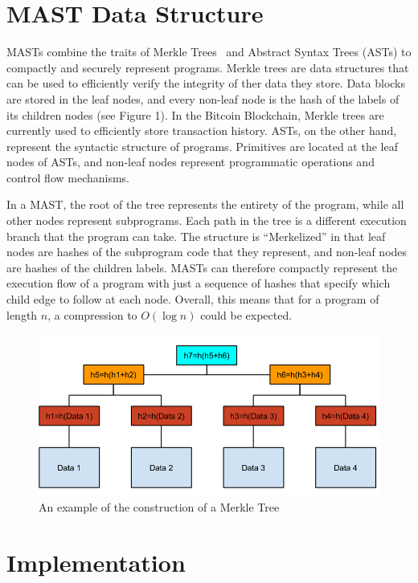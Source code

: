 \documentclass{vldb}
\begin{document}
\section{MAST Data Structure}

MASTs combine the traits of Merkle Trees~\cite{merkle} and Abstract Syntax
Trees (ASTs) to compactly and securely represent programs. Merkle trees are
data structures that can be used to efficiently verify the integrity of ther
data they store.  Data blocks are stored in the leaf nodes, and every non-leaf
node is the hash of the labels of its children nodes (see Figure 1). In the
Bitcoin Blockchain, Merkle trees are currently used to efficiently store
transaction history. ASTs, on the other hand, represent the syntactic structure
of programs. Primitives are located at the leaf nodes of ASTs, and non-leaf
nodes represent programmatic operations and control flow mechanisms.
 
In a MAST, the root of the tree represents the entirety of the program, while
all other nodes represent subprograms. Each path in the tree is a different
execution branch that the program can take. The structure is “Merkelized” in
that leaf nodes are hashes of the subprogram code that they represent, and
non-leaf nodes are hashes of the children labels. MASTs can therefore compactly
represent the execution flow of a program with just a sequence of hashes that
specify which child edge to follow at each node. Overall, this means that for
a program of length $n$, a compression to $O(\log{}n)$ could be expected.

\begin{figure}[h]
	\includegraphics[scale=.4]{merkle_tree}
	\caption{An example of the construction of a Merkle Tree}
	\label{merkle}
\end{figure}

\section{Implementation}
\end{document}
